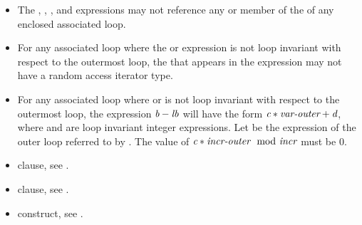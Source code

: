 \begin{itemize}
    \item The , , , and  expressions
      may not reference any  or member of the  of any
      enclosed associated loop.

    \item For any associated loop where the  or  expression is not loop
        invariant with respect to the outermost loop, the  that
        appears in the expression may not have a random access iterator type.

    \item For any associated loop where  or  is not loop invariant with
        respect to the outermost loop, the expression $\plc{b}-\plc{lb}$ will
        have the form $\plc{c}*\plc{var-outer}+\plc{d}$, where  and 
        are loop invariant integer expressions. Let  be the
         expression of the outer loop referred to by
        .  The value of $\plc{c}*\plc{incr-outer} \mod \plc{incr}$ must be 0.

\end{itemize}

\crossreferences
\begin{itemize}
\item {} clause, see .
\item {} clause, see .
\item {} construct, see .

\end{itemize}

